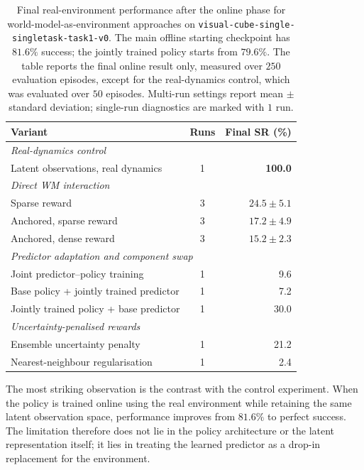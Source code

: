 \begin{table}[h]
\centering
\caption{Final real-environment performance after the online phase for
world-model-as-environment approaches on
\texttt{visual-cube-single-singletask-task1-v0}. The main offline
starting checkpoint has $81.6\%$ success; the jointly trained policy
starts from $79.6\%$. The table reports the final online result only,
measured over $250$ evaluation episodes, except for the real-dynamics
control, which was evaluated over $50$ episodes. Multi-run settings
report mean $\pm$ standard deviation; single-run diagnostics are marked
with $1$ run.}
\label{tab:owm-summary}
\begin{tabular}{lcr}
\toprule
Variant & Runs & Final SR (\%) \\
\midrule
\multicolumn{3}{l}{\emph{Real-dynamics control}} \\
Latent observations, real dynamics & 1 & \textbf{100.0} \\
\midrule
\multicolumn{3}{l}{\emph{Direct WM interaction}} \\
Sparse reward & 3 & $24.5 \pm 5.1$ \\
Anchored, sparse reward & 3 & $17.2 \pm 4.9$ \\
Anchored, dense reward & 3 & $15.2 \pm 2.3$ \\
\midrule
\multicolumn{3}{l}{\emph{Predictor adaptation and component swap}} \\
Joint predictor--policy training & 1 & 9.6 \\
\quad Base policy + jointly trained predictor & 1 & 7.2 \\
\quad Jointly trained policy + base predictor & 1 & 30.0 \\
\midrule
\multicolumn{3}{l}{\emph{Uncertainty-penalised rewards}} \\
Ensemble uncertainty penalty & 1 & 21.2 \\
Nearest-neighbour regularisation & 1 & 2.4 \\
\bottomrule
\end{tabular}
\end{table}

The most striking observation is the contrast with the control
experiment. When the policy is trained online using the real
environment while retaining the same latent observation space,
performance improves from $81.6\%$ to perfect success. The limitation
therefore does not lie in the policy architecture or the latent
representation itself; it lies in treating the learned predictor as a
drop-in replacement for the environment.

